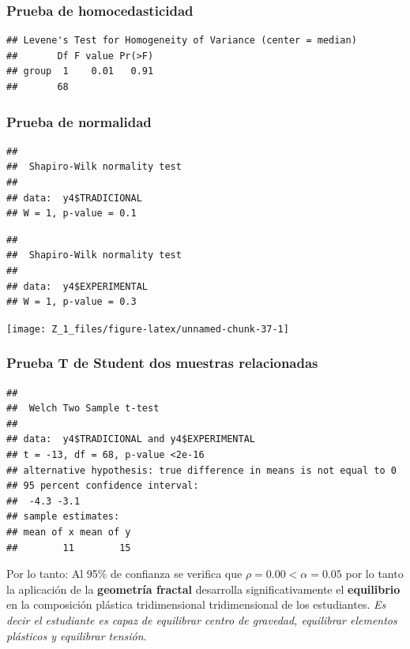 \documentclass[12pt,]{report}
\begin{document}
\hypertarget{prueba-de-homocedasticidad-3}{%
\subsubsection{Prueba de homocedasticidad}\label{prueba-de-homocedasticidad-3}}

\begin{verbatim}
## Levene's Test for Homogeneity of Variance (center = median)
##       Df F value Pr(>F)
## group  1    0.01   0.91
##       68
\end{verbatim}

\hypertarget{prueba-de-normalidad-3}{%
\subsubsection{Prueba de normalidad}\label{prueba-de-normalidad-3}}

\begin{verbatim}
## 
##  Shapiro-Wilk normality test
## 
## data:  y4$TRADICIONAL
## W = 1, p-value = 0.1
\end{verbatim}

\begin{verbatim}
## 
##  Shapiro-Wilk normality test
## 
## data:  y4$EXPERIMENTAL
## W = 1, p-value = 0.3
\end{verbatim}

\begin{center}\texttt{[image: Z\_1\_files/figure-latex/unnamed-chunk-37-1]} \end{center}

\hypertarget{prueba-t-de-student-dos-muestras-relacionadas-3}{%
\subsubsection{Prueba T de Student dos muestras relacionadas}\label{prueba-t-de-student-dos-muestras-relacionadas-3}}

\begin{verbatim}
## 
##  Welch Two Sample t-test
## 
## data:  y4$TRADICIONAL and y4$EXPERIMENTAL
## t = -13, df = 68, p-value <2e-16
## alternative hypothesis: true difference in means is not equal to 0
## 95 percent confidence interval:
##  -4.3 -3.1
## sample estimates:
## mean of x mean of y 
##        11        15
\end{verbatim}

Por lo tanto: Al 95\% de confianza se verifica que \(\rho=0.00<\alpha=0.05\) por lo tanto la aplicación de
la \textbf{geometría fractal} desarrolla significativamente el \textbf{equilibrio} en la composición plástica
tridimensional tridimensional de los estudiantes. \emph{Es decir el estudiante es capaz de equilibrar
centro de gravedad, equilibrar elementos plásticos y equilibrar tensión}.
\end{document}
